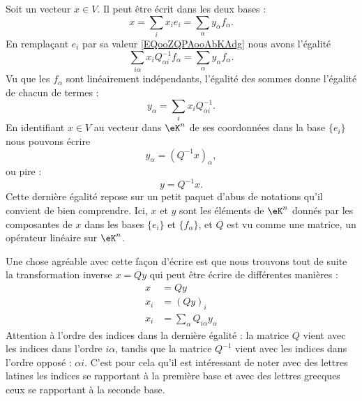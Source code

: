Soit un vecteur \( x\in V\). Il peut être écrit dans les deux bases :
\begin{equation}
    x=\sum_ix_ie_i=\sum_{\alpha}y_{\alpha}f_{\alpha}.
\end{equation}
En remplaçant \( e_i\) par sa valeur \eqref{EQooZQPAooAbKAdg} nous avons l'égalité
\begin{equation}
    \sum_{i\alpha}x_iQ^{-1}_{\alpha i}f_{\alpha}=\sum_{\alpha}y_{\alpha}f_{\alpha}.
\end{equation}
Vu que les \( f_{\alpha}\) sont linéairement indépendants, l'égalité des sommes donne l'égalité de chacun de termes :
\begin{equation}        \label{EQooFXYLooCRmRdA}
    y_{\alpha}=\sum_ix_iQ^{-1}_{\alpha i}.
\end{equation}
En identifiant \( x\in V\) au vecteur dans \( \eK^n\) de ses coordonnées dans la base \( \{ e_i \}\) nous pouvons écrire
\begin{equation}
    y_{\alpha}=(Q^{-1}x)_{\alpha},
\end{equation}
ou pire :
\begin{equation}
    y=Q^{-1}x.
\end{equation}
Cette dernière égalité repose sur un petit paquet d'abus de notations qu'il convient de bien comprendre. Ici, \( x\) et \( y\) sont les éléments de \( \eK^n\) donnés par les composantes de \( x\) dans les bases \( \{ e_i \}\) et \( \{ f_{\alpha} \}\), et \( Q\) est vu comme une matrice, un opérateur linéaire sur \( \eK^n\).

Une chose agréable avec cette façon d'écrire est que nous trouvons tout de suite la transformation inverse \( x=Qy\) qui peut être écrire de différentes manières :
\begin{subequations}
    \begin{align}
        x&=Qy\\
        x_i&=(Qy)_i   \label{SUBEQooPVGBooDafCcBk}  \\
        x_i&=\sum_{\alpha}Q_{i\alpha}y_{\alpha}
    \end{align}
\end{subequations}
Attention à l'ordre des indices dans la dernière égalité : la matrice \( Q\) vient avec les indices dans l'ordre \( i\alpha\), tandis que la matrice \( Q^{-1}\) vient avec les indices dans l'ordre opposé : \( \alpha i\). C'est pour cela qu'il est intéressant de noter avec des lettres latines les indices se rapportant à la première base et avec des lettres grecques ceux se rapportant à la seconde base.

